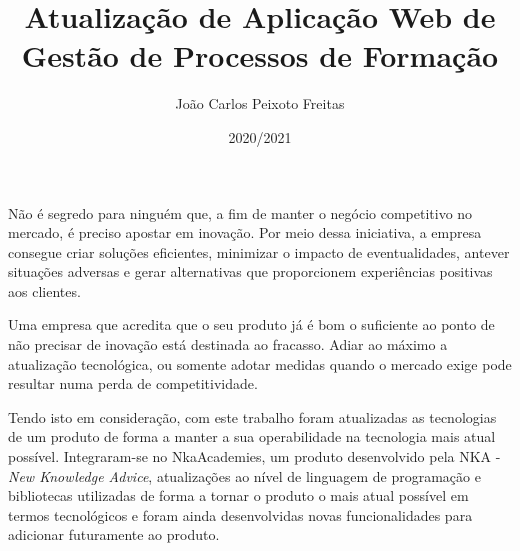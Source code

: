 \documentclass[a4paper,12pt,twoside]{book}
\title{Atualização de Aplicação Web de Gestão de Processos de Formação}
\author{João Carlos Peixoto Freitas}
\date{2020/2021}
\begin{document}
\frontmatter
\maketitle  %


\begin{resumo}

\par Não é segredo para ninguém que, a fim de manter o negócio competitivo no mercado, é preciso apostar em inovação. Por meio dessa iniciativa, a empresa consegue criar soluções eficientes, minimizar o impacto de eventualidades, antever situações adversas e gerar alternativas que proporcionem experiências positivas aos clientes.
\par Uma empresa que acredita que o seu produto já é bom o suficiente ao ponto de não precisar de inovação está destinada ao fracasso. Adiar ao máximo a atualização tecnológica, ou somente adotar medidas quando o mercado exige pode resultar numa perda de competitividade.
\par Tendo isto em consideração, com este trabalho foram atualizadas as tecnologias de um produto de forma a manter a sua operabilidade na tecnologia mais atual possível. Integraram-se no NkaAcademies, um produto desenvolvido pela NKA - \textit{New Knowledge Advice}, atualizações ao nível de linguagem de programação e bibliotecas utilizadas de forma a tornar o produto o mais atual possível em termos tecnológicos e foram ainda desenvolvidas novas funcionalidades para adicionar futuramente ao produto.


\end{resumo}
\end{document}
